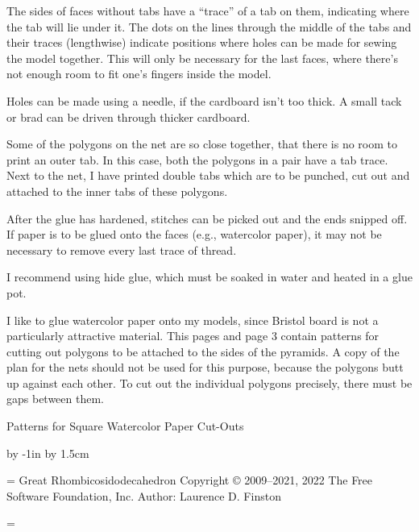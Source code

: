The sides of faces without tabs have a ``trace'' of a tab on them,
indicating where the tab will lie under it.  The dots on the lines
through the middle of the tabs and their traces (lengthwise) indicate
positions where holes can be made for sewing the model together.  This
will only be necessary for the last faces, where there's not enough
room to fit one's fingers inside the model.  

Holes can be made using a needle, if the cardboard isn't too thick.
A small tack or brad can be driven through thicker cardboard.

Some of the polygons on the net are so close together, that there is no room
to print an outer tab.  In this case, both the polygons in a pair have a 
tab trace.  Next to the net, I have printed double tabs which are to be
punched, cut out and attached to the inner tabs of these polygons.

After the glue has hardened, stitches can be picked out and the ends
snipped off.  If paper is to be glued onto the faces (e.g., watercolor
paper), it may not be necessary to remove every last trace of thread.

I recommend using hide glue, which must be soaked in water and heated
in a glue pot.

I like to glue watercolor paper onto my models, since Bristol board is
not a particularly attractive material.  This pages and page 3 contain 
patterns for cutting out polygons to be attached to the sides of the pyramids.
A copy of the plan for the nets should not be used for this purpose, because
the polygons butt up against each other.  To cut out the individual 
polygons precisely, there must be gaps between them.
\par
\endgroup

\baselineskip
\centerline{{\largebx Patterns for Square Watercolor Paper Cut-Outs}}
\baselineskip
{}

\vfil\eject


\advance\hoffset by -1in
\advance\hoffset by 1.5cm




\headline={\hskip 2cm Great Rhombicosidodecahedron\quad %
           Copyright {\copyright} 2009--2021, 2022 The Free Software Foundation, Inc.\hfil %
           \folio\hfil Author:  Laurence D. Finston\hfil}

=\hbox{\hskip 1.5cm}

